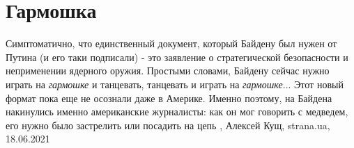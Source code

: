  
 
 
 
 
\chapter{Гармошка}
\label{sec:slova.garmoshka}

Симптоматично, что единственный документ, который Байдену был нужен от Путина
(и его таки подписали) - это заявление о стратегической безопасности и
неприменении ядерного оружия. Простыми словами, Байдену сейчас нужно играть на
\emph{гармошке} и танцевать, танцевать и играть на \emph{гармошке}...  Этот
новый формат пока еще не осознали даже в Америке. Именно поэтому, на Байдена
накинулись именно американские журналисты: как он мог говорить с медведем, его
нужно было застрелить или посадить на цепь
,
Алексей Кущ, strana.ua, 18.06.2021

